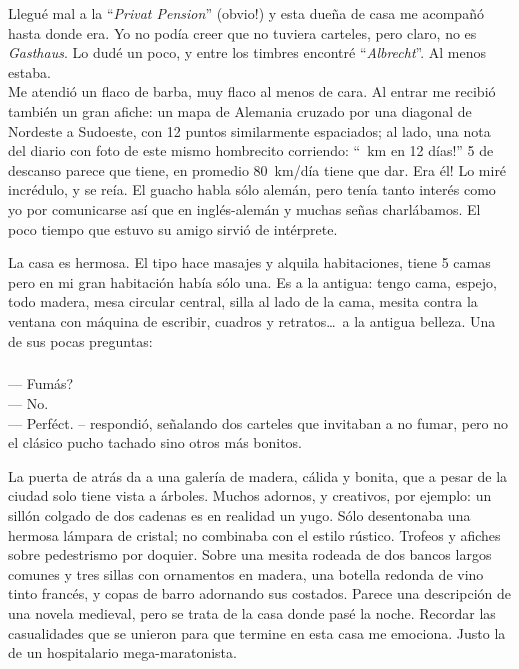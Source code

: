 Llegu\'e mal a la ``\emph{Privat Pension}'' (\textexclamdown obvio!) y esta
due\~na de casa me acompa\~n\'o hasta donde era. Yo no pod\'ia creer que no
tuviera carteles, pero claro, no es \emph{Gasthaus}. Lo dud\'e un poco, y entre
los timbres encontr\'e ``\emph{Albrecht}''. Al menos estaba.\\

Me atendi\'o un flaco de barba, muy flaco al menos de cara. Al entrar me
recibi\'o tambi\'en un gran afiche: un mapa de Alemania cruzado por una
diagonal de Nordeste a Sudoeste, con 12 puntos similarmente espaciados; al
lado, una nota del diario con foto de este mismo hombrecito corriendo:
``~km en 12 d\'ias!'' 5 de descanso parece que tiene, en
promedio 80~km/d\'ia tiene que dar. \textexclamdown Era \'el! Lo mir\'e
incr\'edulo, y se re\'ia. El guacho habla s\'olo alem\'an, pero ten\'ia tanto
inter\'es como yo por comunicarse as\'i que en ingl\'es-alem\'an y muchas
se\~nas charl\'abamos. El poco tiempo que estuvo su amigo sirvi\'o de
int\'erprete.

La casa es hermosa. El tipo hace masajes y alquila habitaciones,
tiene 5 camas pero en mi gran habitaci\'on hab\'ia s\'olo una. Es a la
antigua: tengo cama, espejo, todo madera, mesa circular central, silla al lado
de la cama, mesita contra la ventana con m\'aquina de escribir, cuadros y
retratos\ldots\ a la antigua belleza. Una de sus pocas preguntas:

\subparagraph{}\label{ssub:rauchenSie} --- \textquestiondown Fum\'as?\\ ---
No.\\ --- Perf\'ect. -- respondi\'o, se\~nalando dos carteles que invitaban a
no fumar, pero no el cl\'asico pucho tachado sino otros m\'as bonitos.\\
\hangindent=1cm

La puerta de atr\'as da a una galer\'ia de madera, c\'alida y bonita, que a
pesar de la ciudad solo tiene vista a \'arboles. Muchos adornos, y creativos,
por ejemplo: un sill\'on colgado de dos cadenas es en realidad un yugo. S\'olo
desentonaba una hermosa l\'ampara de cristal; no combinaba con el estilo
r\'ustico. Trofeos y afiches sobre pedestrismo por doquier. Sobre una mesita
rodeada de dos bancos largos comunes y tres sillas con ornamentos en madera,
una botella redonda de vino tinto franc\'es, y copas de barro adornando sus
costados. Parece una descripci\'on de una novela medieval, pero se trata de la
casa donde pas\'e la noche. Recordar las casualidades que se unieron para que
termine en esta casa me emociona. Justo la de un hospitalario mega-maratonista.


